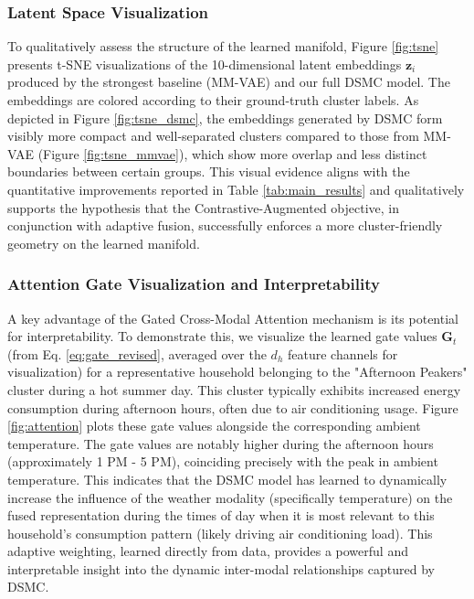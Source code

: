 \documentclass[journal]{IEEEtran}
\begin{document}
\subsubsection{Latent Space Visualization}
To qualitatively assess the structure of the learned manifold, Figure \ref{fig:tsne} presents t-SNE \cite{van2008visualizing} visualizations of the 10-dimensional latent embeddings $\mathbf{z}_i$ produced by the strongest baseline (MM-VAE) and our full DSMC model. The embeddings are colored according to their ground-truth cluster labels. As depicted in Figure \ref{fig:tsne_dsmc}, the embeddings generated by DSMC form visibly more compact and well-separated clusters compared to those from MM-VAE (Figure \ref{fig:tsne_mmvae}), which show more overlap and less distinct boundaries between certain groups. This visual evidence aligns with the quantitative improvements reported in Table \ref{tab:main_results} and qualitatively supports the hypothesis that the Contrastive-Augmented objective, in conjunction with adaptive fusion, successfully enforces a more cluster-friendly geometry on the learned manifold.

\subsubsection{Attention Gate Visualization and Interpretability}
A key advantage of the Gated Cross-Modal Attention mechanism is its potential for interpretability. To demonstrate this, we visualize the learned gate values $\mathbf{G}_t$ (from Eq. \ref{eq:gate_revised}, averaged over the $d_h$ feature channels for visualization) for a representative household belonging to the "Afternoon Peakers" cluster during a hot summer day. This cluster typically exhibits increased energy consumption during afternoon hours, often due to air conditioning usage. Figure \ref{fig:attention} plots these gate values alongside the corresponding ambient temperature. The gate values are notably higher during the afternoon hours (approximately 1 PM - 5 PM), coinciding precisely with the peak in ambient temperature. This indicates that the DSMC model has learned to dynamically increase the influence of the weather modality (specifically temperature) on the fused representation during the times of day when it is most relevant to this household's consumption pattern (likely driving air conditioning load). This adaptive weighting, learned directly from data, provides a powerful and interpretable insight into the dynamic inter-modal relationships captured by DSMC.
\end{document}
